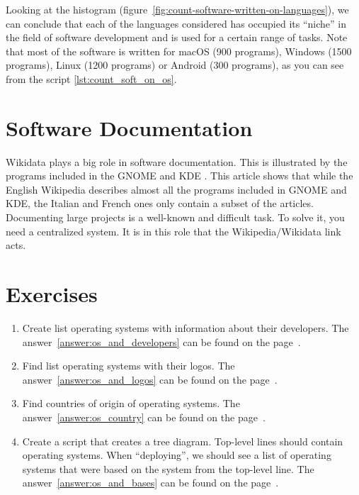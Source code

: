 Looking at the histogram (figure~\ref{fig:count-software-written-on-languages}), we can conclude that each of the languages considered has occupied its ``niche'' in the field of software development and is used for a certain range of tasks. Note that most of the software is written for macOS (900 programs), Windows (1500 programs), Linux (1200 programs) or Android (300 programs), as you can see from the script \ref{lst:count_soft_on_os}.

\section{Software Documentation}
Wikidata plays a big role in software documentation. This is illustrated by the programs included in the GNOME and KDE \cite{Samuel2020DocumentingWiki}. This article shows that while the English Wikipedia describes almost all the programs included in GNOME and KDE, the Italian and French ones only contain a subset of the articles. Documenting large projects is a well-known and difficult task. To solve it, you need a centralized system. It is in this role that the Wikipedia/Wikidata link acts\cite{Samuel2020DocumentingWiki}.

\section{Exercises}
\label{tasks:operating_system_tasks}
\begin{enumerate}
	\item Create list operating systems with information about their developers. The answer~\ref{answer:os_and_developers} can be found on the page~\pageref{answer:os_and_developers}.
	\item Find list operating systems with their logos. The answer~\ref{answer:os_and_logos} can be found on the page~\pageref{answer:os_and_logos}.
	\item Find countries of origin of operating systems. The answer~\ref{answer:os_country} can be found on the page~\pageref{answer:os_country}.
	\item Create a script that creates a tree diagram. Top-level lines should contain operating systems. When ``deploying'', we should see a list of operating systems that were based on the system from the top-level line. The answer~\ref{answer:os_and_bases} can be found on the page~\pageref{answer:os_and_bases}.
\end{enumerate}